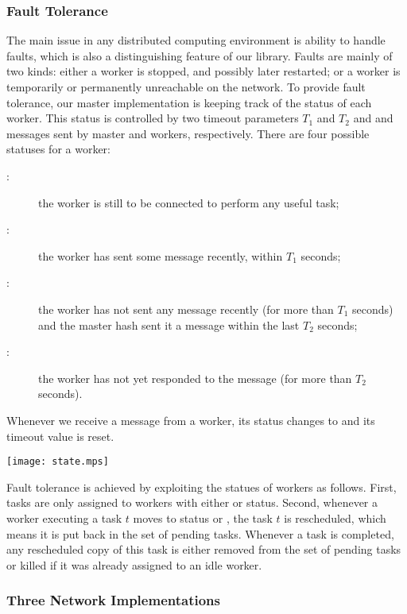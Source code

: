 \documentclass[preprint]{sigplanconf}
\begin{document}
\subsubsection{Fault Tolerance}\label{sec:fault}

The main issue in any distributed computing environment is ability to
handle faults, which is also a distinguishing feature of our library.
Faults are mainly of two kinds: either a worker is stopped, and
possibly later restarted; or a worker is temporarily or permanently
unreachable on the network. To provide fault tolerance, our master
implementation is keeping track of the status of each worker. 
This status is controlled by two timeout parameters $T_1$ and $T_2$
and  and  messages sent by master and workers,
respectively. There are four possible statuses for a worker: 
\begin{description}
\item[:] the worker is still to be
  connected to perform any useful task;
\item[:] the worker has sent some message recently,
  within $T_1$ seconds;
\item[:] the worker has not sent any message recently (for more
  than $T_1$ seconds) and the master hash sent it a  message
  within the last $T_2$ seconds;
\item[:] the worker has not yet responded to the 
  message (for more than $T_2$ seconds).
\end{description}
Whenever we receive a message from a worker, its status changes to
 and its timeout value is reset.

\texttt{[image: state.mps]}

Fault tolerance is achieved by exploiting the statues of workers as
follows. First, tasks are only assigned to workers with either
 or  status. Second, whenever a worker executing
a task $t$ moves to status  or , the
task $t$ is rescheduled, which means it is put back in the set of
pending tasks. Whenever a task is completed, any rescheduled copy of
this task is either removed from the set of pending tasks or killed if
it was already assigned to an idle worker.

\subsubsection{Three Network Implementations} %
\end{document}
